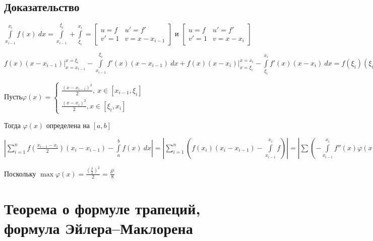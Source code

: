 \documentclass{article}
\begin{document}
		\subsection{Доказательство}

			$\int\limits^{x_i}_{x_{i - 1}} f(x) \ dx = \int\limits^{\xi_i}_{x_{i - 1}} + \int\limits^{x_i}_{\xi_i} = \begin{bmatrix} u = f & u' = f' \\ v' = 1 & v = x - x_{i - 1} \end{bmatrix}$ и $\begin{bmatrix} u = f & u' = f' \\ v' = 1 & v = x - x_i \end{bmatrix}$ 
				
			$f(x)(x - x_{i - 1}) \bigg|^{x = \xi_i}_{x = x_{i - 1}} - \int\limits^{\xi_i}_{x_{i - 1}} f'(x)(x - x_{i - 1}) \ dx + f(x)(x - x_i) \bigg|^{x = x_i}_{x = \xi_i} - \int\limits^{x_i}_{\xi_i} f'(x)(x - x_i) \ dx = f(\xi_i)(\xi_i - x_{i - 1}) + f(\xi_i)(x_i - \xi_i) - \left( f'(x) \frac{(x - x_{c - 1})^2}{2} \bigg|^{x = \xi_i}_{x = x_{i - 1}} - \int\limits^{\xi_i}_{x_{i -1 }} f''(x) \frac{(x - x_{i - 1})^2}{2} \ dx + f'(x) \frac{(x - x_i)^2}{2} \bigg|^{x_i}_{\xi_i} - \int\limits^{x_i}_{\xi_i} f''(x) \frac{(x - x_i)^2}{2} \right) = f(\xi_i)(x_i - x_{i - 1}) + \int\limits^{x_i}_{x_{i - 1}} f''(x) \ \varphi(x) \ dx$

			$Пусть \varphi(x) = \begin{cases} \frac{(x - x_{i - 1})^2}{2}, \ x \in [x_{i - 1}, \xi_i] \\ \frac{(x - x_i)^2}{2}, x \in [\xi_i, x_i] \end{cases}$
			
			Тогда $\varphi(x)$ определена на $[a, b]$

			$\left| \sum\limits^n_{i = 1} f \left( \frac{x_{i - 1} - x_i}{2} \right) (x_i - x_{i - 1}) - \int\limits^b_a f(x) \ dx \right| = \left| \sum\limits^n_{i = 1} \left( f(x_i)(x_i - x_{i - 1}) - \int\limits^{x_i}_{x_{i - 1}} f \right) \right| = \left| \sum \left( - \int\limits^{x_i}_{x_{i - 1}} f''(x) \varphi(x) \ dx \right) \right| = \left| \int\limits^b_a f''(x) \varphi(x) \ dx \right| \leq \int\limits^b_a | f''(x) | \varphi(x) \ dx \leq \frac{\delta^2}{8} \int\limits^b_a | f'' |$

			Поскольку $\max \varphi(x) = \frac{(\frac{\delta}{2})^2}{2} = \frac{\delta^2}{8}$

	\newpage

	\section{Теорема о формуле трапеций, формула Эйлера--Маклорена}
\end{document}
